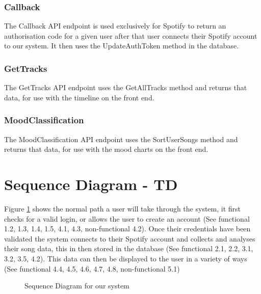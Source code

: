 \documentclass[10pt, notitlepage]{report}
\begin{document}
\subsubsection{Callback}
The Callback API endpoint is used exclusively for Spotify to return an authorisation code for a given user after that user connects their Spotify account to our system. It then uses the UpdateAuthToken method in the database.

\subsubsection{GetTracks}
The GetTracks API endpoint uses the GetAllTracks method and returns that data, for use with the timeline on the front end.

\subsubsection{MoodClassification}
The MoodClassification API endpoint uses the SortUserSongs method and returns that data, for use with the mood charts on the front end.


\section{Sequence Diagram - TD} 

Figure \ref{fig:seqdia} shows the normal path a user will take through the system, it first checks for a valid login, or allows the user to create an account (See functional 1.2, 1.3, 1.4, 1.5, 4.1, 4.3, non-functional 4.2). Once their credentials have been validated the system connects to their Spotify account and collects and analyses their song data, this in then stored in the database (See functional 2.1, 2.2, 3.1, 3.2, 3.5, 4.2). This data can then be displayed to the user in a variety of ways (See functional 4.4, 4.5, 4.6, 4.7, 4.8, non-functional 5.1)

\begin{figure}[h]
	\centering
	\caption{Sequence Diagram for our system}
	\label{fig:seqdia}
\end{figure}
\end{document}
